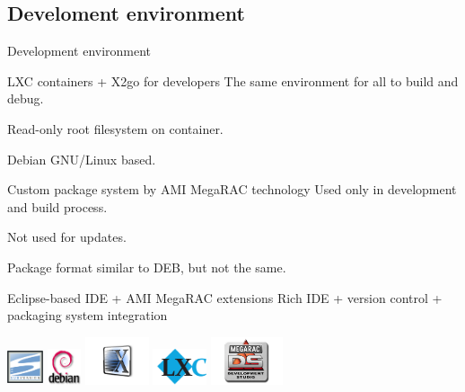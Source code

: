 \documentclass{beamer}
\begin{document}
  \subsection{Develoment environment}

  \begin{frame}{Development environment}
	  \begin{block}{LXC containers + X2go for developers}
		  The same environment for all to build and debug.

		  Read-only root filesystem on container.

		  Debian GNU/Linux based.
	  \end{block}
	  
	  \begin{block}{Custom package system by AMI MegaRAC technology}
		  Used only in development and build process.

		  Not used for updates.

		  Package format similar to DEB, but not the same.
	  \end{block}

	  \begin{block}{Eclipse-based IDE + AMI MegaRAC extensions}
		  Rich IDE + version control + packaging system integration
	  \end{block}
	  
	  \includegraphics[height=30pt,width=30pt]{logo/subversion.png}
	  \includegraphics[height=30pt]{logo/debian.png}
	  \includegraphics[height=40pt]{logo/x2go-logo.png}
	  \includegraphics[height=30pt]{logo/lxc.png}
	  \includegraphics[height=40pt]{logo/megarac-development-studio.png}

  \end{frame}
\end{document}
